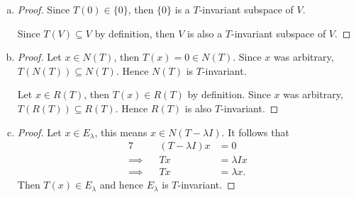 \begin{Exercise}
	\begin{enumerate}[(a)]
		\item
		\begin{proof}
			Since $T(0)\in \{0\}$, then $\{0\}$ is a $T$-invariant subspace of $V$.
			
			Since $T(V)\subseteq V$ by definition, then $V$ is also a $T$-invariant subspace of $V$.
		\end{proof}
		
		\item
		\begin{proof}
			Let $x\in N(T)$, then $T(x) = 0 \in N(T)$. Since $x$ was arbitrary, $T(N(T))\subseteq N(T)$. Hence $N(T)$ is $T$-invariant.
			
			Let $x\in R(T)$, then $T(x) \in R(T)$ by definition. Since $x$ was arbitrary, $T(R(T))\subseteq R(T)$. Hence $R(T)$ is also $T$-invariant.
		\end{proof}
		
		\item
		\begin{proof}
			Let $x\in E_{\lambda}$, this means $x\in N(T-\lambda I)$. It follows that
			\begin{alignat*}{7}
			\quad&& (T-\lambda I)x &= 0 \\
			\implies&& T x &= \lambda I x \\
			\implies&& T x &= \lambda x.
			\end{alignat*}
			Then $T(x) \in E_{\lambda}$ and hence $E_{\lambda}$ is $T$-invariant.
		\end{proof}
	\end{enumerate}
\end{Exercise}